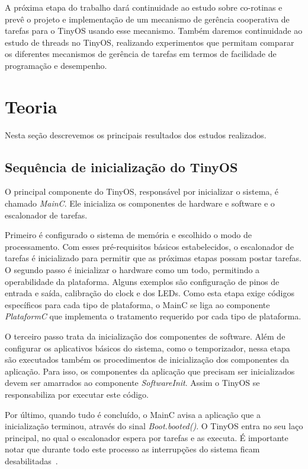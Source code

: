 \documentclass[a4paper, 10pt]{article}
\begin{document}
A próxima etapa do trabalho dará continuidade ao estudo sobre co-rotinas e prevê 
o projeto e implementação de um mecanismo de gerência cooperativa de tarefas para o TinyOS usando
esse mecanismo. 
Também daremos continuidade ao estudo de threads no TinyOS, realizando experimentos 
que permitam comparar os diferentes mecanismos de gerência de tarefas em termos de facilidade
de programação e desempenho. 

\section{Teoria}\label{teoria}
Nesta seção descrevemos os principais resultados dos estudos realizados.

\subsection {Sequência de inicialização do TinyOS}
O principal componente do TinyOS, responsável por inicializar o sistema, é chamado \textit{MainC}. 
Ele inicializa os componentes de hardware e software e o escalonador de tarefas. 

Primeiro é configurado o sistema de memória e escolhido o modo de processamento. 
Com esses pré-requisitos básicos estabelecidos,  o escalonador de tarefas é inicializado 
para permitir que as próximas etapas possam postar tarefas.
O segundo passo é inicializar o hardware como um todo, permitindo a operabilidade da plataforma.
Alguns exemplos são configuração de pinos de entrada e saída, calibração do clock e dos LEDs.
Como esta etapa exige códigos específicos para cada tipo de plataforma, o MainC se liga ao componente
\textit{PlataformC} que implementa o tratamento requerido por cada tipo de plataforma.

O terceiro passo trata da inicialização dos componentes de software. 
Além de configurar os aplicativos básicos do sistema, como
o temporizador, nessa etapa são executados também os procedimentos de inicialização dos componentes 
da aplicação. Para isso, os componentes da aplicação que precisam ser inicializados devem ser amarrados ao componente 
{\em SoftwareInit}. Assim o TinyOS se responsabiliza por executar este código.

Por último, quando tudo é concluído, o MainC avisa a aplicação que a inicialização terminou, através do
sinal \textit{Boot.booted()}. O TinyOS entra no
seu laço principal, no qual o escalonador espera por tarefas e as executa. É importante notar que
durante todo este processo as interrupções do sistema ficam desabilitadas~\cite{TEP107}.
\end{document}
